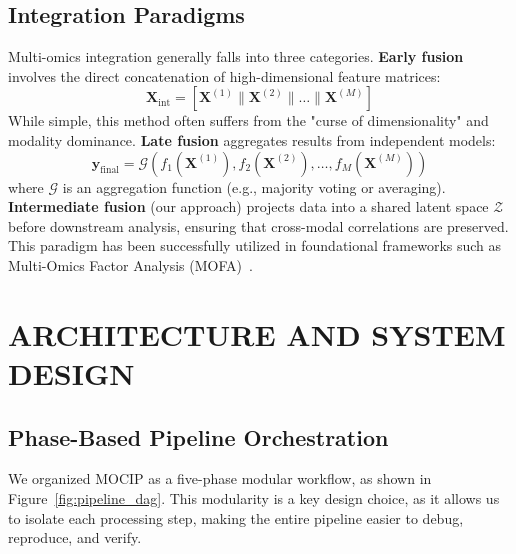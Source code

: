 \documentclass[twocolumn]{article}
\begin{document}
\subsection{Integration Paradigms}
Multi-omics integration generally falls into three categories.
\textbf{Early fusion} involves the direct concatenation of high-dimensional feature matrices:
\begin{equation}
\mathbf{X}_{\text{int}} = \left[ \mathbf{X}^{(1)} \parallel \mathbf{X}^{(2)} \parallel \dots \parallel \mathbf{X}^{(M)} \right]
\end{equation}
While simple, this method often suffers from the "curse of dimensionality" and modality dominance.
\textbf{Late fusion} aggregates results from independent models:
\begin{equation}
\mathbf{y}_{\text{final}} = \mathcal{G}(f_1(\mathbf{X}^{(1)}), f_2(\mathbf{X}^{(2)}), \dots, f_M(\mathbf{X}^{(M)}))
\end{equation}
where $\mathcal{G}$ is an aggregation function (e.g., majority voting or averaging).
\textbf{Intermediate fusion} (our approach) projects data into a shared latent space $\mathcal{Z}$ before downstream analysis, ensuring that cross-modal correlations are preserved. This paradigm has been successfully utilized in foundational frameworks such as Multi-Omics Factor Analysis (MOFA)~\cite{argelaguet2018}.

\section{\uppercase{Architecture and System Design}}

\subsection{Phase-Based Pipeline Orchestration}
We organized MOCIP as a five-phase modular workflow, as shown in Figure~\ref{fig:pipeline_dag}. This modularity is a key design choice, as it allows us to isolate each processing step, making the entire pipeline easier to debug, reproduce, and verify.
\end{document}
